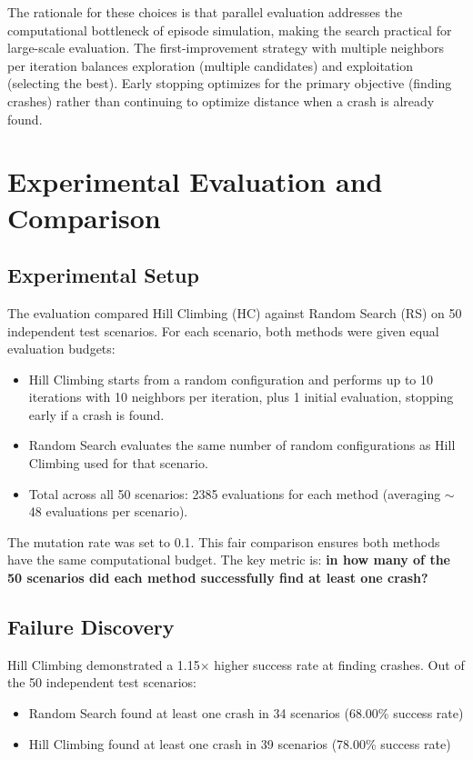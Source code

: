 \documentclass[11pt,a4paper]{article}
\begin{document}
The rationale for these choices is that parallel evaluation addresses the computational bottleneck of episode simulation, making the search practical for large-scale evaluation. The first-improvement strategy with multiple neighbors per iteration balances exploration (multiple candidates) and exploitation (selecting the best). Early stopping optimizes for the primary objective (finding crashes) rather than continuing to optimize distance when a crash is already found.


\section{Experimental Evaluation and Comparison}

\subsection{Experimental Setup}

The evaluation compared Hill Climbing (HC) against Random Search (RS) on 50 independent test scenarios. For each scenario, both methods were given equal evaluation budgets:
\begin{itemize}
\item Hill Climbing starts from a random configuration and performs up to 10 iterations with 10 neighbors per iteration, plus 1 initial evaluation, stopping early if a crash is found.
\item Random Search evaluates the same number of random configurations as Hill Climbing used for that scenario.
\item Total across all 50 scenarios: 2385 evaluations for each method (averaging $\sim$48 evaluations per scenario).
\end{itemize}
The mutation rate was set to 0.1. This fair comparison ensures both methods have the same computational budget. The key metric is: \textbf{in how many of the 50 scenarios did each method successfully find at least one crash?}

\subsection{Failure Discovery}

Hill Climbing demonstrated a 1.15$\times$ higher success rate at finding crashes. Out of the 50 independent test scenarios:
\begin{itemize}
\item Random Search found at least one crash in 34 scenarios (68.00\% success rate)
\item Hill Climbing found at least one crash in 39 scenarios (78.00\% success rate)
\end{itemize}
\end{document}

